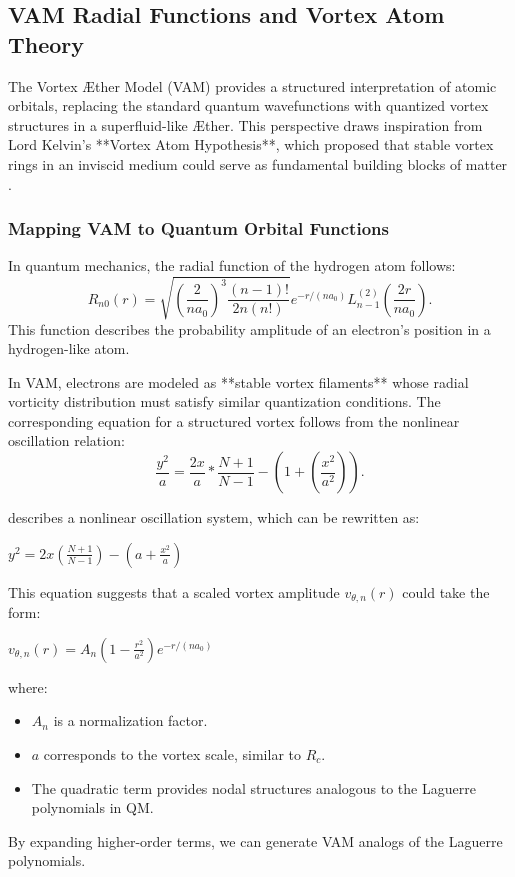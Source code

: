 

\subsection{VAM Radial Functions and Vortex Atom Theory}

The Vortex Æther Model (VAM) provides a structured interpretation of atomic orbitals, replacing the standard quantum wavefunctions with quantized vortex structures in a superfluid-like Æther. This perspective draws inspiration from Lord Kelvin's **Vortex Atom Hypothesis**, which proposed that stable vortex rings in an inviscid medium could serve as fundamental building blocks of matter \cite{kelvin1867_vortexAtoms}.

\subsubsection{Mapping VAM to Quantum Orbital Functions}

In quantum mechanics, the radial function of the hydrogen atom follows:
\begin{equation}
    R_{n0}(r) = \sqrt{\left(\frac{2}{n a_0}\right)^3 \frac{(n-1)!}{2n(n!)}} e^{-r / (n a_0)} L_{n-1}^{(2)}\left(\frac{2r}{n a_0}\right).
\end{equation}
This function describes the probability amplitude of an electron's position in a hydrogen-like atom.

In VAM, electrons are modeled as **stable vortex filaments** whose radial vorticity distribution must satisfy similar quantization conditions. The corresponding equation for a structured vortex follows from the nonlinear oscillation relation:
\begin{equation}
    \frac{y^2}{a} = \frac{2 x}{a} * \frac{N + 1}{N - 1} - \left(1 + \left(\frac{x^2}{a^2}\right)\right).
\end{equation}


describes a nonlinear oscillation system, which can be rewritten as:

$y^2 = 2x \left(\frac{N+1}{N-1}\right) - \left(a + \frac{x^2}{a}\right)$

This equation suggests that a scaled vortex amplitude $v_{\theta, n}(r)$ could take the form:

$v_{\theta, n}(r) = A_n \left(1 - \frac{r^2}{a^2}\right) e^{-r / (n a_0)}$

where:

\begin{itemize}
\item $A_n$ is a normalization factor.
\item $a$ corresponds to the vortex scale, similar to $R_c$.
\item The quadratic term provides nodal structures analogous to the Laguerre polynomials in QM.
\end{itemize}
By expanding higher-order terms, we can generate VAM analogs of the Laguerre polynomials.


